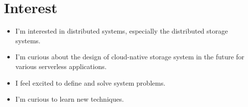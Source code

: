 \documentclass[letterpaper,11pt]{article}
\makeatletter
\newcommand{\resumeItem}[2]{
  \item\small{
    \textbf{#1}{ #2 \vspace{-2pt}}
  }
}
\newcommand{\resumeSubheading}[4]{
  \vspace{-1pt}\item
    \begin{tabular*}{0.97\textwidth}[t]{l@{\extracolsep{\fill}}r}
      \textbf{#1} & #2 \\
      \textit{\small#3} & \textit{\small #4} \\
    \end{tabular*}\vspace{-5pt}
}
\newcommand{\resumeSubItem}[2]{\resumeItem{#1}{#2}\vspace{-4pt}}
\newcommand{\resumeSubHeadingListStart}{\begin{itemize}[leftmargin=*]}
\newcommand{\resumeSubHeadingListEnd}{\end{itemize}}
\newcommand{\resumeItemListStart}{\begin{itemize}}
\newcommand{\resumeItemListEnd}{\end{itemize}\vspace{-5pt}}
\makeatother
\begin{document}
\section{Interest}
  \resumeSubHeadingListStart
  \resumeSubItem{}{I'm interested in distributed systems, especially the distributed storage systems.}
  \resumeSubItem{}{I'm curious about the design of cloud-native storage system in the future for various serverless applications.}
  \resumeSubItem{}{I feel excited to define and solve system problems.}
  \resumeSubItem{}{I'm curious to learn new techniques.}
  \resumeSubHeadingListEnd
    
% 
% 
\end{document}
